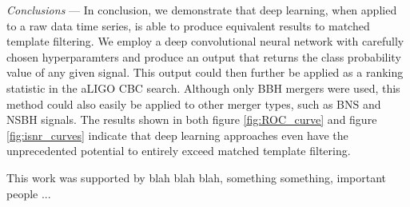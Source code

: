 \documentclass[%
 amsmath,amssymb,
 aps,
 twocolumn,
 prl,
 reprint,
floatfix,
]{revtex4-1}
\begin{document}
\textit{Conclusions} --- In conclusion, we demonstrate that deep learning, when applied to a raw data time series, is able to produce equivalent results to matched template filtering. We employ a deep convolutional neural network with carefully chosen hyperparamters and produce an output that returns the class probability value of any given signal. This output could then further be applied as a ranking statistic in the aLIGO CBC search. Although only BBH mergers were used, this method could also easily be applied to other merger types, such as BNS and NSBH signals. The results shown in both figure \ref{fig:ROC_curve} and figure \ref{fig:isnr_curves} indicate that deep learning approaches even have the unprecedented potential to entirely exceed matched template filtering. 

This work was supported by blah blah blah, something something, important people ... 





\end{document}
